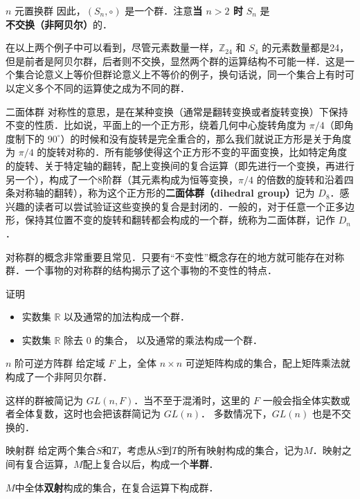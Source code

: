 \begin{example}{$n$ 元置换群}
因此，$(S_n, \circ)$ 是一个群．注意\textbf{当 $n>2$ 时} $S_n$ 是\textbf{不交换（非阿贝尔）}的．
\end{example}

在以上两个例子中可以看到，尽管元素数量一样，$\mathbb{Z}_{24}$ 和 $S_4$ 的元素数量都是24，但是前者是阿贝尔群，后者则不交换，显然两个群的运算结构不可能一样．这是一个集合论意义上等价但群论意义上不等价的例子，换句话说，同一个集合上有时可以定义多个不同的运算使之成为不同的群．

\begin{example}{二面体群}\label{Group_ex4}
对称性的意思，是在某种变换（通常是翻转变换或者旋转变换）下保持不变的性质．比如说，平面上的一个正方形，绕着几何中心旋转角度为 $\pi/4$（即角度制下的 $90^\circ$）的时候和没有旋转是完全重合的，那么我们就说正方形是关于角度为 $\pi/4$ 的旋转对称的．所有能够使得这个正方形不变的平面变换，比如特定角度的旋转、关于特定轴的翻转，配上变换间的复合运算（即先进行一个变换，再进行另一个），构成了一个8阶群（其元素构成为恒等变换，$\pi/4$ 的倍数的旋转和沿着四条对称轴的翻转），称为这个正方形的\textbf{二面体群（dihedral group）}记为 $D_8$．感兴趣的读者可以尝试验证这些变换的复合是封闭的．一般的，对于任意一个正多边形，保持其位置不变的旋转和翻转都会构成的一个群，统称为二面体群，记作 $D_n$．
\end{example}
对称群的概念非常重要且常见．只要有“不变性”概念存在的地方就可能存在对称群．一个事物的对称群的结构揭示了这个事物的不变性的特点．

\begin{exercise}{}
证明
\begin{itemize}
\item 实数集 $\mathbb R$ 以及通常的加法构成一个群．
\item 实数集 $\mathbb R$ 除去 $0$ 的集合， 以及通常的乘法构成一个群．
\end{itemize}
\end{exercise}

\begin{example}{$n$ 阶可逆方阵群}\label{Group_ex5}
给定域 $F$ 上，全体 $n\times n$ 可逆矩阵构成的集合，配上矩阵乘法就构成了一个非阿贝尔群．%

这样的群被简记为 $GL(n, F)$．当不至于混淆时，这里的 $F$ 一般会指全体实数或者全体复数，这时也会把该群简记为 $GL(n)$． 多数情况下，$GL(n)$ 也是不交换的．
\end{example}


\begin{example}{映射群}\label{Group_ex6}
给定两个集合$S$和$T$，考虑从$S$到$T$的所有映射构成的集合，记为$M$．映射之间有复合运算，$M$配上复合以后，构成一个\textbf{半群}．

$M$中全体\textbf{双射}构成的集合，在复合运算下构成群．
\end{example}

